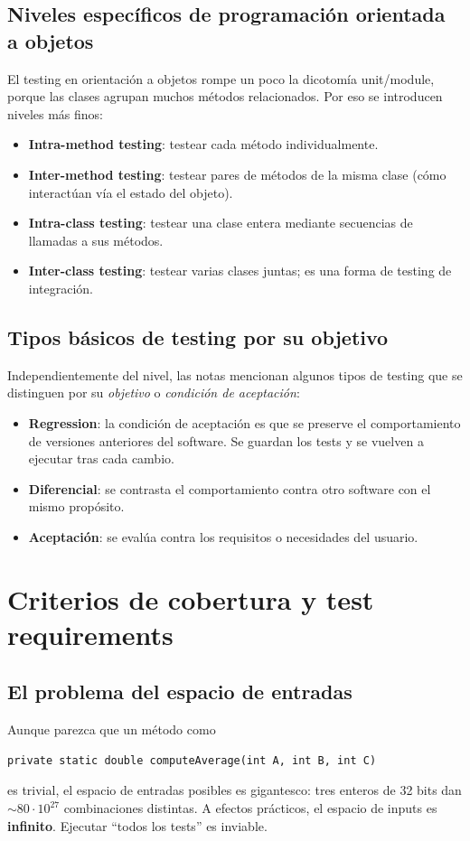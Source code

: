 \documentclass[12pt,a4paper]{article}
\begin{document}
\subsection{Niveles específicos de programación orientada a objetos}
El testing en orientación a objetos rompe un poco la dicotomía unit/module, porque las clases agrupan muchos métodos relacionados. Por eso se introducen niveles más finos:
\begin{itemize}
  \item \textbf{Intra-method testing}: testear cada método individualmente.
  \item \textbf{Inter-method testing}: testear pares de métodos de la misma clase (cómo interactúan vía el estado del objeto).
  \item \textbf{Intra-class testing}: testear una clase entera mediante secuencias de llamadas a sus métodos.
  \item \textbf{Inter-class testing}: testear varias clases juntas; es una forma de testing de integración.
\end{itemize}

\subsection{Tipos básicos de testing por su objetivo}
Independientemente del nivel, las notas mencionan algunos tipos de testing que se distinguen por su \textit{objetivo} o \textit{condición de aceptación}:
\begin{itemize}
  \item \textbf{Regression}: la condición de aceptación es que se preserve el comportamiento de versiones anteriores del software. Se guardan los tests y se vuelven a ejecutar tras cada cambio.
  \item \textbf{Diferencial}: se contrasta el comportamiento contra otro software con el mismo propósito.
  \item \textbf{Aceptación}: se evalúa contra los requisitos o necesidades del usuario.
\end{itemize}

\section{Criterios de cobertura y test requirements}
\subsection{El problema del espacio de entradas}
Aunque parezca que un método como
\begin{lstlisting}[style=javastyle]
private static double computeAverage(int A, int B, int C)
\end{lstlisting}
es trivial, el espacio de entradas posibles es gigantesco: tres enteros de 32 bits dan $\sim 80 \cdot 10^{27}$ combinaciones distintas. A efectos prácticos, el espacio de inputs es \textbf{infinito}. Ejecutar ``todos los tests'' es inviable.
\end{document}
